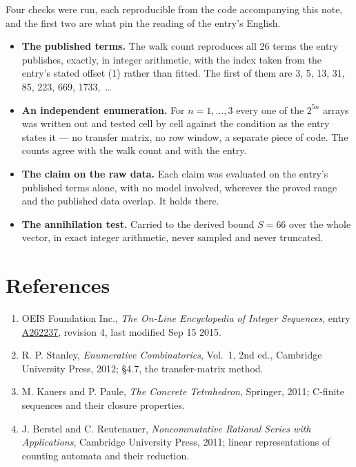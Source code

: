 \documentclass[11pt]{article}
\theoremstyle{definition}
\begin{document}
Four checks were run, each reproducible from the code accompanying this note, and the first two are what pin the reading of the entry's English.

\begin{itemize}

\item {\bfseries The published terms.} The walk count reproduces all 26 terms the entry publishes, exactly, in integer arithmetic, with the index taken from the entry's stated offset (1) rather than fitted. The first of them are 3, 5, 13, 31, 85, 223, 669, 1733,~\dots

\item {\bfseries An independent enumeration.} For $n = 1,\dots,3$ every one of the $2^{5n}$ arrays was written out and tested cell by cell against the condition as the entry states it --- no transfer matrix, no row window, a separate piece of code. The counts agree with the walk count and with the entry.

\item {\bfseries The claim on the raw data.} Each claim was evaluated on the entry's published terms alone, with no model involved, wherever the proved range and the published data overlap. It holds there.

\item {\bfseries The annihilation test.} Carried to the derived bound $S = 66$ over the whole vector, in exact integer arithmetic, never sampled and never truncated.

\end{itemize}

\section{References}

\begin{enumerate}

\item OEIS Foundation Inc., \emph{The On-Line Encyclopedia of Integer Sequences}, entry \href{https://oeis.org/A262237}{A262237}, revision 4, last modified Sep 15 2015.

\item R. P. Stanley, \emph{Enumerative Combinatorics}, Vol.~1, 2nd ed., Cambridge University Press, 2012; \S4.7, the transfer-matrix method.

\item M. Kauers and P. Paule, \emph{The Concrete Tetrahedron}, Springer, 2011; C-finite sequences and their closure properties.

\item J. Berstel and C. Reutenauer, \emph{Noncommutative Rational Series with Applications}, Cambridge University Press, 2011; linear representations of counting automata and their reduction.

\end{enumerate}
\end{document}

